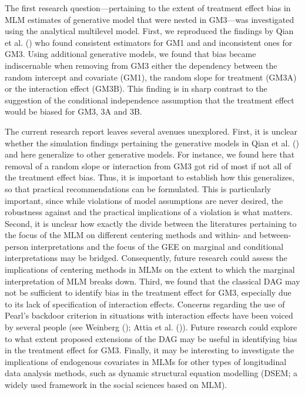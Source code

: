 \documentclass[
  11pt,
  a4paper,
]{article}
\begin{document}
The first research question---pertaining to the extent of treatment
effect bias in MLM estimates of generative model that were nested in
GM3---was investigated using the analytical multilevel model. First, we
reproduced the findings by Qian et al. ()
who found consistent estimators for GM1 and and inconsistent ones for
GM3. Using additional generative models, we found that bias became
indiscernable when removing from GM3 either the dependency between the
random intercept and covariate (GM1), the random slope for treatment
(GM3A) or the interaction effect (GM3B). This finding is in sharp
contrast to the suggestion of the conditional independence assumption
that the treatment effect would be biased for GM3, 3A and 3B.

The current research report leaves several avenues unexplored. First, it
is unclear whether the simulation findings pertaining the generative
models in Qian et al. () and here
generalize to other generative models. For instance, we found here that
removal of a random slope or interaction from GM3 got rid of most if not
all of the treatment effect bias. Thus, it is important to establish how
this generalizes, so that practical recommendations can be formulated.
This is particularly important, since while violations of model
assumptions are never desired, the robustness against and the practical
implications of a violation is what matters. Second, it is unclear how
exactly the divide between the literatures pertaining to the focus of
the MLM on different centering methods and within- and between-person
interpretations and the focus of the GEE on marginal and conditional
interpretations may be bridged. Consequently, future research could
assess the implications of centering methods in MLMs on the extent to
which the marginal interpretation of MLM breaks down. Third, we found
that the classical DAG may not be sufficient to identify bias in the
treatment effect for GM3, especially due to its lack of specification of
interaction effects. Concerns regarding the use of Pearl's backdoor
criterion in situations with interaction effects have been voiced by
several people (see Weinberg (); Attia
et al. ()). Future research could explore
to what extent proposed extensions of the DAG may be useful in
identifying bias in the treatment effect for GM3. Finally, it may be
interesting to investigate the implications of endogenous covariates in
MLMs for other types of longitudinal data analysis methods, such as
dynamic structural equation modelling (DSEM; a widely used framework in
the social sciences based on MLM).
\end{document}
